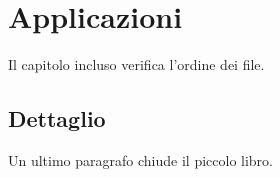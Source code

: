 \chapter{Applicazioni}

Il capitolo incluso verifica l'ordine dei file.

\section{Dettaglio}

Un ultimo paragrafo chiude il piccolo libro.

